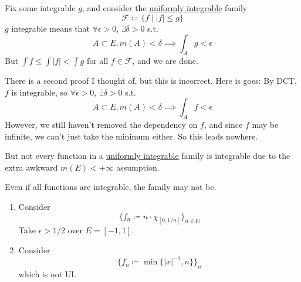   \begin{example}
    \label{ex:dominated-family-of-integrable-function-is-ui}
    Fix some integrable $g$, and consider the \hyperref[def:uniformly-integrable]{uniformly integrable} family 
    \begin{equation}
      \mathscr{F} \coloneqq \{ f \mid |f| \leq g \}
    \end{equation}
    $g$ integrable means that $\forall \epsilon > 0$, $\exists \delta > 0$ s.t. 
    \begin{equation}
      A \subset E, m(A) < \delta \implies \int_A g < \epsilon
    \end{equation}
    But $\int f \leq \int |f| < \int g$ for all $f \in \mathscr{F}$, and we are done.   

    There is a second proof I thought of, but this is incorrect. Here is goes: By DCT, $f$ is integrable, so $\forall \epsilon > 0$, $\exists \delta > 0$ s.t. 
    \begin{equation}
      A \subset E, m(A) < \delta \implies \int_A f < \epsilon
    \end{equation}
    However, we still haven't removed the dependency on $f$, and since $f$ may be infinite, we can't just take the minimum either. So this leads nowhere. 
  \end{example}

  But not every function in a \hyperref[def:uniformly-integrable]{uniformly integrable} family is integrable due to the extra awkward $m(E) < +\infty$ assumption.  

  \begin{example}
    \label{ex:family-of-integrable-functions-may-not-be-ui}
    Even if all functions are integrable, the family may not be. 
    \begin{enumerate}
      \item Consider 
      \begin{equation}
        \{f_n \coloneqq n \cdot \chi_{[0, 1/n]}\}_{n \in \mathbb{N}} 
      \end{equation}
      Take $\epsilon > 1/2$ over $E = [-1, 1]$. 

      \item Consider 
      \begin{equation}
        \{f_n \coloneqq \min\{|x|^{-1}, n\} \}_n
      \end{equation}
      which is not UI. 
    \end{enumerate}
  \end{example}

